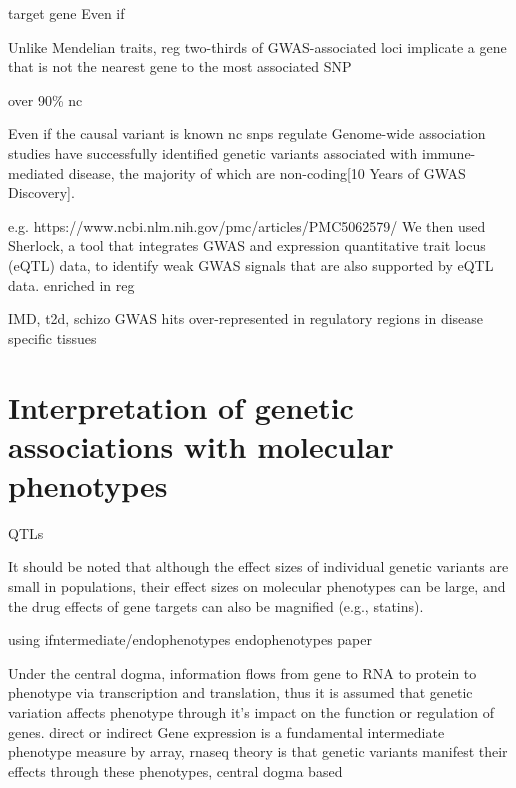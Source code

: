 \begin{outline}

target gene
Even if 

Unlike Mendelian traits, reg
    two-thirds of GWAS-associated loci implicate a gene that is not the nearest gene to the most associated SNP

over 90\% nc \autocite{gallagher2018PostGWASEraAssociation}

    \2 Even if the causal variant is known
    \2 nc snps regulate
        \3 Genome-wide association studies have successfully identified genetic variants associated with immune-mediated disease, the majority of which are non-coding[10 Years of GWAS Discovery].

        e.g.
            https://www.ncbi.nlm.nih.gov/pmc/articles/PMC5062579/
            We then used Sherlock, a tool that integrates GWAS and expression quantitative trait locus (eQTL) data, to identify weak GWAS signals that are also supported by eQTL data. 
    \2 enriched in reg



IMD, t2d, schizo
GWAS hits over-represented in regulatory regions in disease specific tissues 

\section{Interpretation of genetic associations with molecular phenotypes}



QTLs
\autocite{visscher201710YearsGWAS}

It should be noted that although
the effect sizes of individual genetic variants are small in
populations, their effect sizes on molecular phenotypes
can be large, and the drug effects of gene targets can also
be magnified (e.g., statins).

\1 using ifntermediate/endophenotypes
    \2 endophenotypes paper \autocite{goldman2007DeconstructionVulnerabilityComplex}

\1 Under the central dogma, information flows from gene to RNA to protein to phenotype via transcription and translation, thus it is assumed that genetic variation affects phenotype through it's impact on the function or regulation of genes.
direct or indirect
\1 Gene expression is a fundamental intermediate phenotype
        \2 measure by array, rnaseq 
    \2 theory is that genetic variants manifest their effects through these phenotypes, central dogma based


\end{outline}
